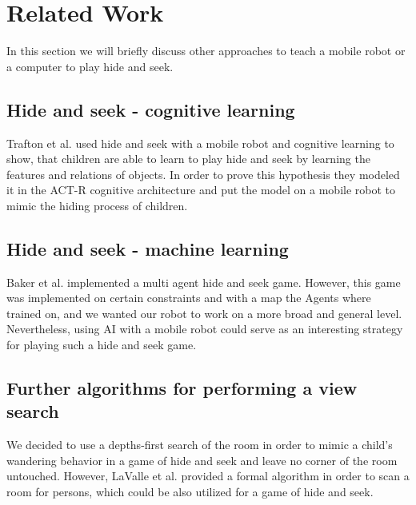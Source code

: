\documentclass[conference]{IEEEtran}
\begin{document}
\section{Related Work}
In this section we will briefly discuss other approaches to teach a mobile robot or a computer to play hide and seek.\\
\subsection{Hide and seek - cognitive learning}
Trafton et al. \cite{b1} used hide and seek with a mobile robot and cognitive learning to show, that children are able to learn to play hide and seek 
by learning the features and relations of objects. In order to prove this hypothesis they modeled it in the ACT-R cognitive architecture and 
put the model on a mobile robot to mimic the hiding process of children.
\subsection{Hide and seek - machine learning}
Baker et al. \cite{b2} implemented a multi agent hide and seek game. 
However, this game was implemented on certain constraints and with a map the Agents where trained on, and we wanted our robot 
to work on a more broad and general level. 
Nevertheless, using AI with a mobile robot could serve as an interesting strategy for playing such a hide and seek game.
\subsection{Further algorithms for performing a view search}
We decided to use a depths-first search of the room in order to mimic a child's wandering behavior in a game of hide and seek and leave no corner of the room untouched.
However, LaValle et al. \cite{b3} provided a formal algorithm in order to scan a room for persons, which could be also utilized for a game of hide and seek.\\\\
\end{document}
